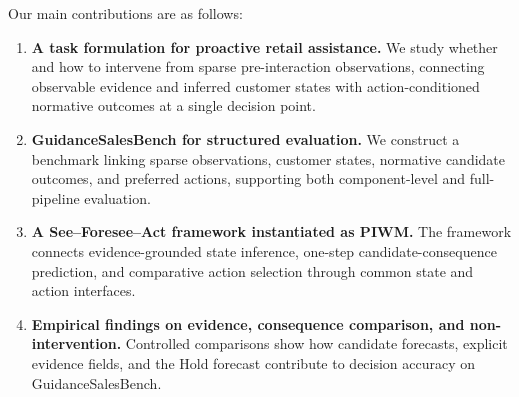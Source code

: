 \documentclass{article}
\providecommand{\tightlist}{\setlength{\itemsep}{0pt}\setlength{\parskip}{0pt}}
\begin{document}

Our main contributions are as follows:

\begin{enumerate}
\item
  \textbf{A task formulation for proactive retail assistance.}
  We study whether and how to intervene from sparse pre-interaction
  observations, connecting observable evidence and inferred customer
  states with action-conditioned normative outcomes at a single
  decision point.

\item
  \textbf{GuidanceSalesBench for structured evaluation.}
  We construct a benchmark linking sparse observations, customer
  states, normative candidate outcomes, and preferred actions,
  supporting both component-level and full-pipeline evaluation.

\item
  \textbf{A See--Foresee--Act framework instantiated as PIWM.}
  The framework connects evidence-grounded state inference,
  one-step candidate-consequence prediction, and comparative
  action selection through common state and action interfaces.

\item
  \textbf{Empirical findings on evidence, consequence comparison,
  and non-intervention.}
  Controlled comparisons show how candidate forecasts, explicit
  evidence fields, and the Hold forecast contribute to decision
  accuracy on GuidanceSalesBench.
\end{enumerate}
\end{document}
